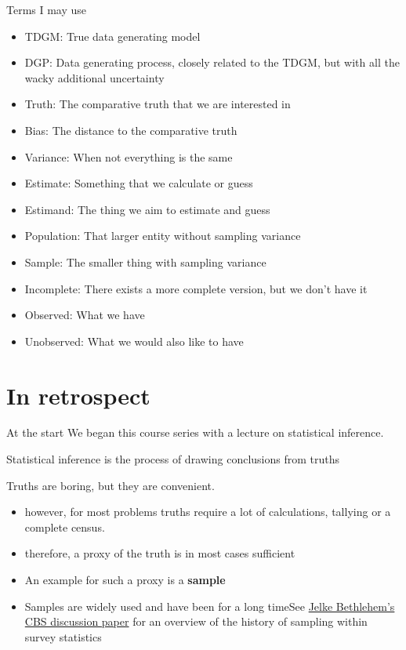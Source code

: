 \documentclass[
  ignorenonframetext,
]{beamer}
\providecommand{\tightlist}{%
  \setlength{\itemsep}{0pt}\setlength{\parskip}{0pt}}\usepackage{longtable,booktabs,array}
\begin{document}
\begin{frame}{Terms I may use}
\protect\hypertarget{terms-i-may-use}{}
\begin{itemize}
\tightlist
\item
  TDGM: True data generating model
\item
  DGP: Data generating process, closely related to the TDGM, but with
  all the wacky additional uncertainty
\item
  Truth: The comparative truth that we are interested in
\item
  Bias: The distance to the comparative truth
\item
  Variance: When not everything is the same
\item
  Estimate: Something that we calculate or guess
\item
  Estimand: The thing we aim to estimate and guess
\item
  Population: That larger entity without sampling variance
\item
  Sample: The smaller thing with sampling variance
\item
  Incomplete: There exists a more complete version, but we don't have it
\item
  Observed: What we have
\item
  Unobserved: What we would also like to have
\end{itemize}
\end{frame}

\hypertarget{in-retrospect}{%
\section{In retrospect}\label{in-retrospect}}

\begin{frame}{At the start}
\protect\hypertarget{at-the-start}{}
We began this course series with a lecture on statistical inference.

Statistical inference is the process of drawing conclusions from truths

Truths are boring, but they are convenient.

\begin{itemize}
\tightlist
\item
  however, for most problems truths require a lot of calculations,
  tallying or a complete census.
\item
  therefore, a proxy of the truth is in most cases sufficient
\item
  An example for such a proxy is a \textbf{sample}
\item
  Samples are widely used and have been for a long timeSee
  \href{https://www.google.com/url?sa=t\&rct=j\&q=\&esrc=s\&source=web\&cd=\&ved=2ahUKEwjkyPTCs4L3AhUCuKQKHUpmBvIQFnoECAMQAw\&url=https\%3A\%2F\%2Fwww.cbs.nl\%2F-\%2Fmedia\%2Fimported\%2Fdocuments\%2F2009\%2F07\%2F2009-15-x10-pub.pdf\&usg=AOvVaw3BpUW2s_k0MB5yH1o-QGf2}{Jelke
  Bethlehem's CBS discussion paper} for an overview of the history of
  sampling within survey statistics
\end{itemize}
\end{frame}
\end{document}
